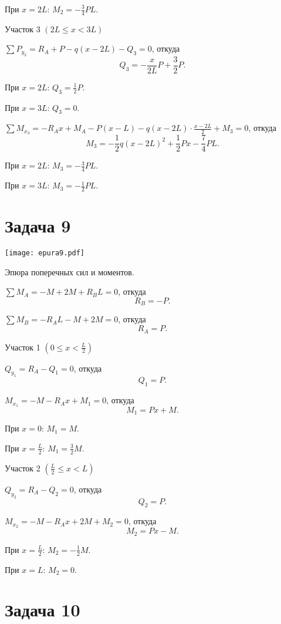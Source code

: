 При $x = 2L$: $M_2 = -\frac{3}{4}PL$.

Участок 3 $\left(2L \le x < 3L\right)$

$\sum P_{y_3} = R_A + P - q(x - 2L) - Q_3 = 0$,
откуда
\[
    Q_3 = -\frac{x}{2L}P + \frac{3}{2}P.
\]

При $x = 2L$: $Q_3 = \frac{1}{2}P$.

При $x = 3L$: $Q_3 = 0$.

$\sum M_{x_3} = -R_A x + M_A - P(x - L) - q(x - 2L) \cdot \frac{x-2L}{2} + M_3 = 0$,
откуда
\[
    M_3 = -\frac{1}{2}q(x - 2L)^2 + \frac{1}{2}Px - \frac{7}{4}PL.
\]

При $x = 2L$: $M_3 = -\frac{3}{4}PL$.

При $x = 3L$: $M_3 = -\frac{1}{2}PL$.

\newpage


\section{Задача 9}

\begin{floatingfigure}[r]{0.5\textwidth}
    \centering
    \texttt{[image: epura9.pdf]}
    \caption{Эпюра поперечных сил и моментов.}
    \label{fig:chap1-epura9}
\end{floatingfigure}

$\sum M_A = -M + 2M + R_B L = 0$,
откуда
\[
    R_B = -P.
\]

$\sum M_B = -R_A L - M + 2M = 0$,
откуда
\[
    R_A = P.
\]

Участок 1 $\left(0 \le x < \frac{L}{2}\right)$

$Q_{y_1} = R_A - Q_1 = 0$,
откуда
\[
    Q_1 = P.
\]

$M_{x_1} = -M - R_A x + M_1 = 0$,
откуда
\[
    M_1 = Px + M.
\]

При $x = 0$: $M_1 = M$.

При $x = \frac{L}{2}$: $M_1 = \frac{3}{2} M$.

Участок 2 $\left(\frac{L}{2} \le x < L\right)$

$Q_{y_2} = R_A - Q_2 = 0$,
откуда
\[
    Q_2 = P.
\]

$M_{x_2} = -M - R_A x + 2M + M_2 = 0$,
откуда
\[
    M_2 = Px - M.
\]

При $x = \frac{L}{2}$: $M_2 = -\frac{1}{2} M$.

При $x = L$: $M_2 = 0$.

\newpage


\section{Задача 10}

